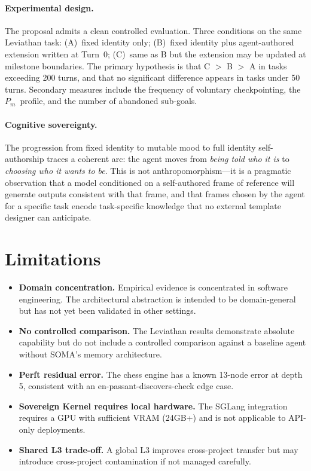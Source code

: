 \documentclass[11pt,a4paper]{article}
\newcommand{\soma}{\textsc{SOMA}}
\newcommand{\Pm}{\ensuremath{P_m}}
\begin{document}
\paragraph{Experimental design.}
The proposal admits a clean controlled evaluation.
Three conditions on the same Leviathan task:
(A)~fixed identity only;
(B)~fixed identity plus agent-authored extension written at Turn~0;
(C)~same as B but the extension may be updated at milestone boundaries.
The primary hypothesis is that C $>$ B $>$ A in tasks exceeding
200 turns, and that no significant difference appears in tasks
under 50 turns.
Secondary measures include the frequency of voluntary checkpointing,
the \Pm\ profile, and the number of abandoned sub-goals.

\paragraph{Cognitive sovereignty.}
The progression from fixed identity to mutable mood to full
identity self-authorship traces a coherent arc:
the agent moves from \emph{being told who it is} to
\emph{choosing who it wants to be}.
This is not anthropomorphism---it is a pragmatic observation
that a model conditioned on a self-authored frame of reference
will generate outputs consistent with that frame,
and that frames chosen by the agent for a specific task
encode task-specific knowledge that no external template designer
can anticipate.

\section{Limitations}

\begin{itemize}[leftmargin=*]
  \item \textbf{Domain concentration.}
        Empirical evidence is concentrated in software engineering.
        The architectural abstraction is intended to be domain-general
        but has not yet been validated in other settings.
  \item \textbf{No controlled comparison.}
        The Leviathan results demonstrate absolute capability but do not
        include a controlled comparison against a baseline agent without
        \soma's memory architecture.
  \item \textbf{Perft residual error.}
        The chess engine has a known 13-node error at depth 5,
        consistent with an en-passant-discovers-check edge case.
  \item \textbf{Sovereign Kernel requires local hardware.}
        The SGLang integration requires a GPU with sufficient VRAM
        (24GB+) and is not applicable to API-only deployments.
  \item \textbf{Shared L3 trade-off.}
        A global L3 improves cross-project transfer but may introduce
        cross-project contamination if not managed carefully.
\end{itemize}
\end{document}
